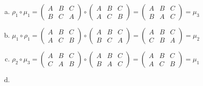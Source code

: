 \begin{enumerate}[(a)]
\item
$\rho_1 \circ \mu_1 = \begin{pmatrix}
A & B & C\\
B & C & A
\end{pmatrix} \circ \begin{pmatrix}
A & B & C\\
A & C & B
\end{pmatrix}=\begin{pmatrix}
A & B & C\\
B & A & C
\end{pmatrix}=\mu_3$

\item
$\mu_1\circ \rho_1=\begin{pmatrix}
A & B & C\\
A & C & B
\end{pmatrix}\circ \begin{pmatrix}
A & B & C\\
B & C & A
\end{pmatrix}=\begin{pmatrix}
A & B & C\\
C & B & A
\end{pmatrix}=\mu_2$

\item
$\rho_2\circ \mu_3=\begin{pmatrix}
A & B & C\\
C & A & B
\end{pmatrix}\circ \begin{pmatrix}
A & B & C\\
B & A & C
\end{pmatrix}=\begin{pmatrix}
A & B & C\\
A & C & B
\end{pmatrix}=\mu_1$

\item

\end{enumerate}

